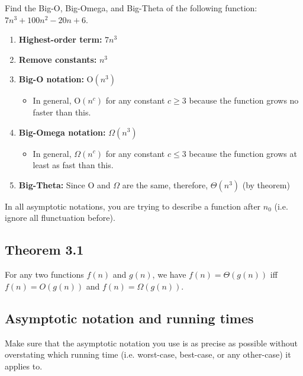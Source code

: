 
\begin{example}
    Find the Big-O, Big-Omega, and Big-Theta of the following function: $7n^3 + 100n^2 - 20n + 6$. 

    \begin{enumerate}
        \item \textbf{Highest-order term:} $7n^3$
        \item \textbf{Remove constants:} $n^3$
        \item \textbf{Big-O notation:} $\text{O}(n^3)$
        \begin{itemize}
            \item In general, $\text{O}(n^c)$ for any constant $c\geq3$ because the function grows no faster than this.
        \end{itemize}
        \item \textbf{Big-Omega notation:} $\Omega (n^3)$
        \begin{itemize}
            \item In general, $\Omega (n^c)$ for any constant $c\leq3$ because the function grows at least as fast than this.
        \end{itemize}
        \item \textbf{Big-Theta:} Since O and $\Omega$ are the same, therefore, $\Theta (n^3)$ (by theorem)
    \end{enumerate}
\end{example}

\begin{intuition}
    In all asymptotic notations, you are trying to describe a function after $n_0$ (i.e. ignore all flunctuation before).
\end{intuition}

\subsection{Theorem 3.1}
    \begin{theorem}
        For any two functions $f(n)$ and $g(n)$, we have $f(n) = \Theta(g(n))$ iff $f(n) = O(g(n))$ and $f(n)=\Omega(g(n))$.
    \end{theorem}

\subsection{Asymptotic notation and running times}
    \begin{warning}
        Make sure that the asymptotic notation you use is as precise as possible without overstating which running time (i.e. worst-case, best-case, or any other-case) it applies to.
    \end{warning}


